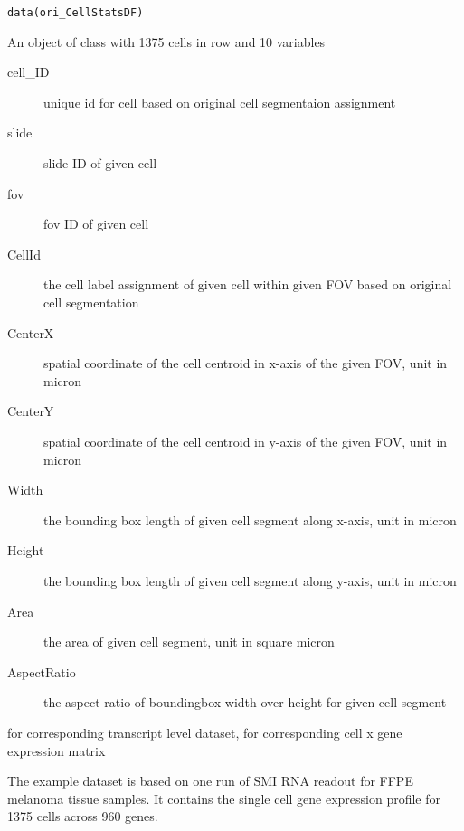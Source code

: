 \documentclass[letterpaper]{book}
\begin{document}
%
\begin{Usage}
\begin{verbatim}
data(ori_CellStatsDF)
\end{verbatim}
\end{Usage}
%
\begin{Format}
An object of class  with 1375 cells in row and 10 variables
\begin{description}

\item[cell\_ID] unique id for cell based on original cell segmentaion assignment
\item[slide] slide ID of given cell
\item[fov] fov ID of given cell
\item[CellId] the cell label assignment of given cell within given FOV based on original cell segmentation
\item[CenterX] spatial coordinate of the cell centroid in x-axis of the given FOV, unit in micron
\item[CenterY] spatial coordinate of the cell centroid in y-axis of the given FOV, unit in micron
\item[Width] the bounding box length of given cell segment along x-axis, unit in micron
\item[Height] the bounding box length of given cell segment along y-axis, unit in micron
\item[Area] the area of given cell segment, unit in square micron
\item[AspectRatio] the aspect ratio of boundingbox width over height for given cell segment

\end{description}

\end{Format}
%
\begin{SeeAlso}
 for corresponding transcript level dataset,  for corresponding cell x gene expression matrix
\end{SeeAlso}
%
\begin{Description}
The example dataset is based on one run of SMI RNA readout for FFPE melanoma tissue samples. It contains the single cell gene expression profile for 1375 cells across 960 genes.
\end{Description}
\end{document}
